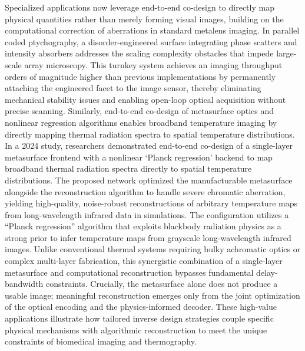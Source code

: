 Specialized applications now leverage end-to-end co-design to directly map physical quantities rather than merely forming visual images, building on the computational correction of aberrations in standard metalens imaging. In parallel coded ptychography, a disorder-engineered surface integrating phase scatters and intensity absorbers addresses the scaling complexity obstacles that impede large-scale array microscopy. This turnkey system achieves an imaging throughput orders of magnitude higher than previous implementations by permanently attaching the engineered facet to the image sensor, thereby eliminating mechanical stability issues and enabling open-loop optical acquisition without precise scanning. Similarly, end-to-end co-design of metasurface optics and nonlinear regression algorithms enables broadband temperature imaging by directly mapping thermal radiation spectra to spatial temperature distributions. In a 2024 study, researchers demonstrated end-to-end co-design of a single-layer metasurface frontend with a nonlinear `Planck regression' backend to map broadband thermal radiation spectra directly to spatial temperature distributions. The proposed network optimized the manufacturable metasurface alongside the reconstruction algorithm to handle severe chromatic aberration, yielding high-quality, noise-robust reconstructions of arbitrary temperature maps from long-wavelength infrared data in simulations. \citep{doi_10_1002_adom_202402498_4083d234} The configuration utilizes a ``Planck regression'' algorithm that exploits blackbody radiation physics as a strong prior to infer temperature maps from grayscale long-wavelength infrared images. Unlike conventional thermal systems requiring bulky achromatic optics or complex multi-layer fabrication, this synergistic combination of a single-layer metasurface and computational reconstruction bypasses fundamental delay-bandwidth constraints. Crucially, the metasurface alone does not produce a usable image; meaningful reconstruction emerges only from the joint optimization of the optical encoding and the physics-informed decoder. These high-value applications illustrate how tailored inverse design strategies couple specific physical mechanisms with algorithmic reconstruction to meet the unique constraints of biomedical imaging and thermography. \citep{doi_10_1021_acsphotonics_1c01085_479fdea3} \citep{doi_10_1002_adom_202402498_4083d234}

